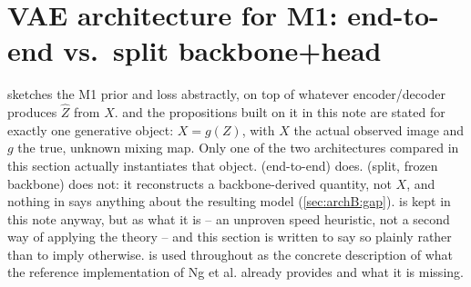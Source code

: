 \section{VAE architecture for M1: end-to-end vs.\ split backbone+head}
\label{sec:arch}

\begin{center}
\end{center}

 sketches the M1 prior and loss abstractly, on top of whatever encoder/decoder
produces $\hat Z$ from $X$.  and the propositions built on it in this note are stated for
exactly one generative object: $X=g(Z)$, with $X$ the actual observed image and $g$ the true, unknown
mixing map. Only one of the two architectures compared in this section actually instantiates that
object.  (end-to-end) does.  (split, frozen backbone) does not: it
reconstructs a backbone-derived quantity, not $X$, and nothing in \cite{ng2025} says anything about the
resulting model (\cref{sec:archB:gap}).  is kept in this note anyway, but as what it
is -- an unproven speed heuristic, not a second way of applying the theory -- and this section is
written to say so plainly rather than to imply otherwise.  is used throughout as the
concrete description of what the reference implementation of Ng et al. \cite{ngimpl} already provides
and what it is missing.

